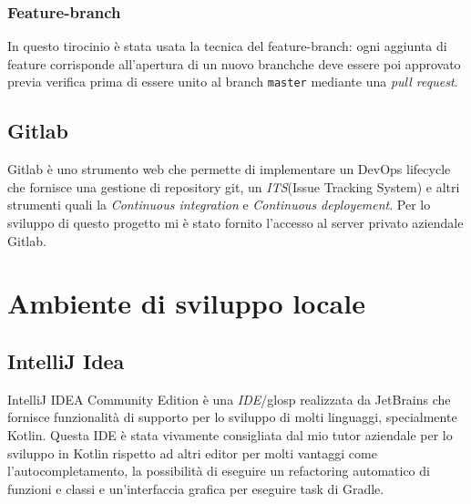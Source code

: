\subsubsection*{Feature-branch}
In questo tirocinio è stata usata la tecnica del feature-branch: ogni aggiunta di feature corrisponde all'apertura di un nuovo branch\glosp che deve essere poi approvato previa verifica prima di essere unito al branch \verb|master| mediante una \emph{pull request}.

\subsection{Gitlab}
Gitlab è uno strumento web che permette di implementare un DevOps lifecycle che fornisce una gestione di repository git, un \emph{ITS}\glosp (Issue Tracking System) e altri strumenti quali la \emph{Continuous integration} e \emph{Continuous deployement}. Per lo sviluppo di questo progetto mi è stato fornito l'accesso al server privato aziendale Gitlab.

\section{Ambiente di sviluppo locale}
\subsection{IntelliJ Idea}
IntelliJ IDEA Community Edition è una \emph{IDE}/glosp realizzata da JetBrains che fornisce funzionalità di supporto per lo sviluppo di molti linguaggi, specialmente Kotlin. Questa IDE è stata vivamente consigliata dal mio tutor aziendale per lo sviluppo in Kotlin rispetto ad altri editor per molti vantaggi come l'autocompletamento, la possibilità di eseguire un refactoring automatico di funzioni e classi e un'interfaccia grafica per eseguire task di Gradle.
 
